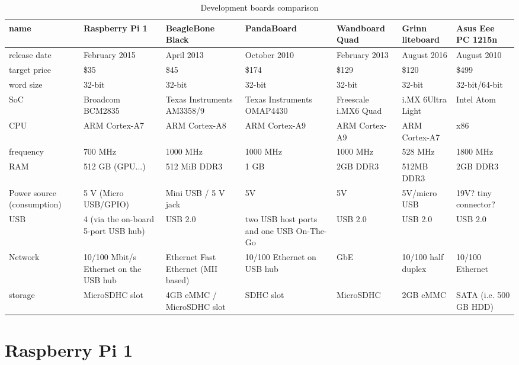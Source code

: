 \documentclass[printmode]{mgr}
\begin{document}
\begin{landscape}

\renewcommand{\arraystretch}{2}
\begin{table}
  \begin{tabular}{| p{3cm} | p{3cm} | p{3cm} | p{3cm} | p{3cm} | p{3cm} | p{3cm} |}
    \hline
    name & Raspberry Pi 1 & BeagleBone Black & PandaBoard & Wandboard Quad & Grinn liteboard & Asus Eee PC 1215n \\
    \hline
    release date & February 2015 & April 2013 & October 2010 & February 2013 & August 2016 & August 2010\\
    \hline
    target price & \$35 & \$45 & \$174 & \$129 & \$120 & \$499\\
    \hline
    word size & 32-bit & 32-bit & 32-bit & 32-bit & 32-bit & 32-bit/64-bit \\
    \hline
    SoC & Broadcom BCM2835 & Texas Instruments AM3358/9 & Texas Instruments OMAP4430 & Freescale i.MX6 Quad & i.MX 6Ultra Light & Intel Atom\\
    \hline
    CPU & ARM Cortex-A7 & ARM Cortex-A8 & ARM Cortex-A9 & ARM Cortex-A9 & ARM Cortex-A7 & x86\\
    \hline
    frequency & 700 MHz & 1000 MHz & 1000 MHz & 1000 MHz & 528 MHz & 1800 MHz\\
    \hline
    RAM & 512 GB (GPU...) & 512 MiB DDR3 & 1 GB & 2GB DDR3 & 512MB DDR3  & 2GB DDR3\\
    \hline
    Power source (consumption) & 5 V (Micro USB/GPIO) & Mini USB / 5 V jack & 5V & 5V & 5V/micro USB & 19V? tiny connector?\\
    \hline
    USB & 4 (via the on-board 5-port USB hub) & USB 2.0 & two USB host ports and one USB On-The-Go & USB 2.0 & USB 2.0 & USB 2.0\\
    \hline
    Network & 10/100 Mbit/s Ethernet on the USB hub & Ethernet Fast Ethernet (MII based) & 10/100 Ethernet on USB hub & GbE & 10/100 half duplex & 10/100 Ethernet\\
    \hline
    storage & MicroSDHC slot & 4GB eMMC / MicroSDHC slot & SDHC slot & MicroSDHC & 2GB
    eMMC & SATA (i.e. 500 GB HDD)\\
    \hline
  \end{tabular}
  \caption{Development boards comparison}
\end{table}

\end{landscape}

\section{Raspberry Pi 1}
\end{document}
